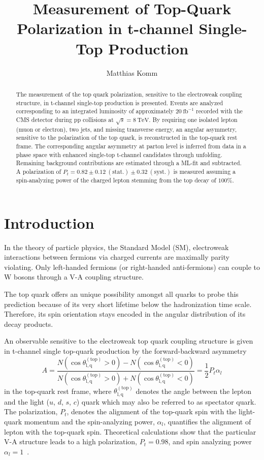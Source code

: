 \documentclass[a4paper]{jpconf}
\newcommand{\unit}[1]{\ensuremath{\mathrm{~#1}}}
\newcommand{\particle}[1]{\ensuremath{#1}}
\newcommand{\costheta}[0]{\cos\theta_{\mathrm{l,q}}^{\mathrm{(top)}}}
\begin{document}
\title{Measurement of Top-Quark Polarization in t-channel Single-Top Production}

\author{Matthias Komm}

\address{Centre for Cosmology, Particle Physics and Phenomenology, Universit\'e catholique de Louvain, 1348 Louvain-la-Neuve, Belgium}


\begin{abstract}
The measurement of the top quark polarization, sensitive to the electroweak coupling structure, in t-channel single-top production is presented. Events are analyzed corresponding to an integrated luminosity of approximately $20\unit{fb^{-1}}$ recorded with the CMS detector during pp collisions at $\sqrt{s}=8\unit{TeV}$. By requiring one isolated lepton (muon or electron), two jets, and missing transverse energy, an angular asymmetry, sensitive to the  polarization of the top quark, is reconstructed in the top-quark rest frame. The corresponding angular asymmetry at parton level is inferred from data in a phase space with enhanced single-top t-channel candidates through unfolding. Remaining background contributions are estimated through a ML-fit and subtracted. A polarization of $P_{t}=0.82\pm0.12\mathrm{~(stat.)}\pm0.32\mathrm{~(syst.)}$ is measured assuming a spin-analyzing power of the charged lepton stemming from the top decay of $100\%$.
\end{abstract}

\section{Introduction}
In the theory of particle physics, the Standard Model (SM), electroweak interactions between fermions via charged currents are maximally parity violating. Only left-handed fermions (or right-handed anti-fermions) can couple to W bosons through a V-A coupling structure.


The top quark offers an unique possibility amongst all quarks to probe this prediction because of its very short lifetime below the hadronization time scale. Therefore, its spin orientation stays encoded in the angular distribution of its decay products.


An observable sensitive to the electroweak top quark coupling structure is given in t-channel single top-quark production by the forward-backward asymmetry
\begin{equation}
\label{eq:asym}
A=\frac{N(\costheta>0)-N(\costheta<0)}{N(\costheta>0)+N(\costheta<0)}=\frac{1}{2}P_{t}\alpha_{l} 
\end{equation}
in the top-quark rest frame, where $\theta_{\mathrm{l,q}}^{\mathrm{(top)}}$ denotes the angle between the lepton and the light ($\particle{u}$, $\particle{d}$, $\particle{s}$, $\particle{c}$) quark which may also be referred to as spectator quark. The polarization, $P_{t}$, denotes the alignment of the top-quark spin with the light-quark momentum and the spin-analyzing power, $\alpha_{l}$, quantifies the alignment of lepton with the top-quark spin. Theoretical calculations show that the particular V-A structure leads to a high polarization, $P_{t}=0.98$, and spin analyzing power $\alpha_{l}=1$~\cite{bernreuther}.
\end{document}
